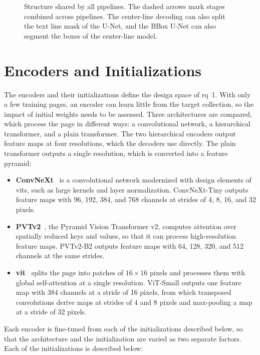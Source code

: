 \begin{figure}[htbp]
    \centering
    \resizebox{\textwidth}{!}{}
    \caption[Structure shared by all pipelines]{Structure shared by all pipelines. The dashed arrows mark stages combined across pipelines. The center-line decoding can also split the text line mask of the U-Net, and the BBox U-Net can also segment the boxes of the center-line model.}
    \label{fig:pipeline-overview}
\end{figure}

\section{Encoders and Initializations}
\label{sec:backbones}

The encoders and their initializations define the design space of \gls{rq}~1. With only a few training pages, an encoder can learn little from the target collection, so the impact of initial weights needs to be assessed. Three architectures are compared, which process the page in different ways: a convolutional network, a hierarchical transformer, and a plain transformer. The two hierarchical encoders output feature maps at four resolutions, which the decoders use directly. The plain transformer outputs a single resolution, which is converted into a feature pyramid:

\label{sec:encoder-architectures}
\begin{itemize}
    \item \textbf{ConvNeXt}~\cite{liu2022convnet2020s} is a convolutional network modernized with design elements of \glspl{vit}, such as large kernels and layer normalization. ConvNeXt-Tiny outputs feature maps with 96, 192, 384, and 768 channels at strides of 4, 8, 16, and 32 pixels.
    \item \textbf{PVTv2}~\cite{wang2022pvtv2}, the Pyramid Vision Transformer v2, computes attention over spatially reduced keys and values, so that it can process high-resolution feature maps. PVTv2-B2 outputs feature maps with 64, 128, 320, and 512 channels at the same strides.
    \item \textbf{\gls{vit}}~\cite{dosovitskiy2021imageworth16x16words} splits the page into patches of \(16\times16\) pixels and processes them with global self-attention at a single resolution. ViT-Small outputs one feature map with 384 channels at a stride of 16 pixels, from which transposed convolutions derive maps at strides of 4 and 8 pixels and max-pooling a map at a stride of 32 pixels.
\end{itemize}
Each encoder is fine-tuned from each of the initializations described below, so that the architecture and the initialization are varied as two separate factors. Each of the initializations is described below:

